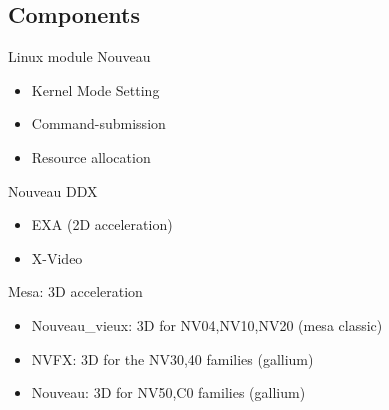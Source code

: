 \documentclass[11pt,english,compress]{beamer}
\begin{document}
	\subsection{Components}
		\begin{frame}
			\begin{block}{Linux module Nouveau}
				\begin{itemize}
					\item Kernel Mode Setting
					\item Command-submission
					\item Resource allocation
				\end{itemize}
			\end{block}

			\begin{block}{Nouveau DDX}
				\begin{itemize}
					\item EXA (2D acceleration) 
					\item X-Video
				\end{itemize}
			\end{block}

			\begin{block}{Mesa: 3D acceleration}
				\begin{itemize}
					\item Nouveau\_vieux: 3D for NV04,NV10,NV20 (mesa classic)
					\item NVFX: 3D for the NV30,40 families (gallium)
					\item Nouveau: 3D for NV50,C0 families (gallium)
				\end{itemize}
			\end{block}
		\end{frame}
\end{document}
